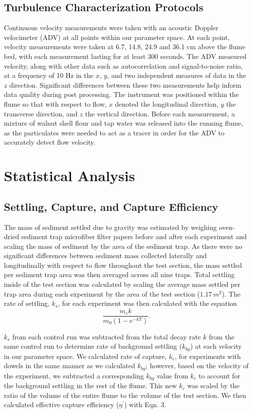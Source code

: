 \documentclass{scrreprt}
\begin{document}
\subsection{Turbulence Characterization Protocols}
Continuous velocity measurements were taken with an acoustic Doppler velocimeter (ADV) at all points within our parameter space. At each point, velocity measurements were taken at 6.7, 14.8, 24.9 and 36.1 cm above the flume bed, with each measurement lasting for at least 300 seconds. The ADV measured velocity, along with other data such as autocorrelation and signal-to-noise ratio, at a frequency of 10 Hz in the $x$, $y$, and two independent measures of data in the $z$ direction. Significant differences between these two measurements help inform data quality during post processing. The instrument was positioned within the flume so that with respect to flow, $x$ denoted the longitudinal direction, $y$ the transverse direction, and $z$ the vertical direction. Before each measurement, a mixture of walnut shell flour and tap water was released into the running flume, as the particulates were needed to act as a tracer in order for the ADV to accurately detect flow velocity.

\section{Statistical Analysis}

\subsection{Settling, Capture, and Capture Efficiency}
The mass of sediment settled due to gravity was estimated by weighing oven-dried sediment trap microfiber filter papers before and after each experiment and scaling the mass of sediment by the area of the sediment trap. As there were no significant differences between sediment mass collected laterally and longitudinally with respect to flow throughout the test section, the mass settled per sediment trap area was then averaged across all nine traps. Total settling inside of the test section was calculated by scaling the average mass settled per trap area during each experiment by the area of the test section ($1.17\, m^{2}$). The rate of settling, $k_{s}$, for each experiment was then calculated with the equation \[\frac{m_{s}k}{m_{0}(1-e^{-kT})}.\] 

$k_{s}$ from each control run was subtracted from the total decay rate $k$ from the same control run to determine rate of background settling ($k_{bg}$) at each velocity in our parameter space. We calculated rate of capture, $k_{c}$, for experiments with dowels in the same manner as we calculated $k_{bg}$; however, based on the velocity of the experiment, we subtracted a corresponding $k_{bg}$ value from $k_{c}$ to account for the background settling in the rest of the flume. This new $k_{c}$ was scaled by the ratio of the volume of the entire flume to the volume of the test section. We then calculated effective capture efficiency ($\eta^{\prime}$) with Eqn. 3. 
\end{document}
